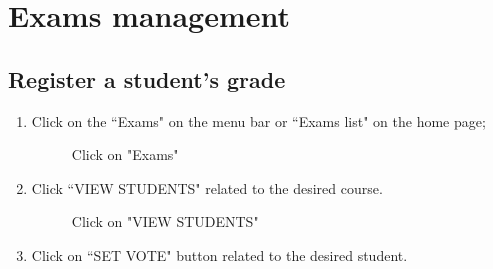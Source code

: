 \documentclass[ManualeUtente]{subfiles}
\begin{document}
\section{Exams management}
\subsection{Register a student's grade}
\begin{enumerate}
	\item Click on the \textquotedblleft Exams" on the menu bar or \textquotedblleft Exams list" on the home page;
	\begin{figure}[H]
		\centering
		\caption{Click on "Exams"}
		\label{fig:Click on "Exams"}
	\end{figure}
	\item Click \textquotedblleft VIEW STUDENTS" related to the desired course.
	\begin{figure}[H]
		\centering
		\caption{Click on "VIEW STUDENTS"}
		\label{fig:Click on "VIEW STUDENTS"}
	\end{figure} \newpage
	\item Click on \textquotedblleft SET VOTE" button related to the desired student.
	\begin{figure}[H]
		\centering

\end{figure}
\end{enumerate}
\end{document}

